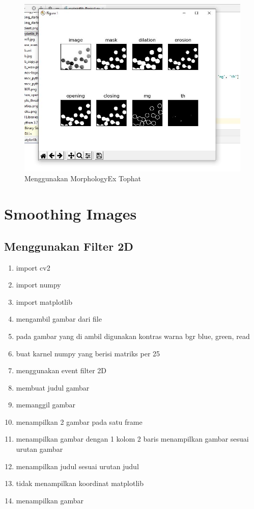 \begin{figure}[ht]
\centering
\includegraphics[scale=0.5]{figures/2,58.jpg}
\caption{Menggunakan MorphologyEx Tophat}
\label{contoh}
\end{figure}







\newpage
\section{Smoothing Images}
\subsection{Menggunakan Filter 2D}

\begin{enumerate}
	\item import cv2
	\item import numpy
	\item import matplotlib
	\item mengambil gambar dari file
	\item pada gambar yang di ambil digunakan kontras warna bgr blue, green, read
	\item buat karnel numpy yang berisi matriks per 25
	\item menggunakan event filter 2D
	\item membuat judul gambar
	\item memanggil gambar
	\item menampilkan 2 gambar pada satu frame
	\item menampilkan gambar dengan 1 kolom 2 baris menampilkan gambar sesuai urutan gambar
	\item menampilkan judul sesuai urutan judul
	\item tidak menampilkan koordinat matplotlib
	\item menampilkan gambar
\end{enumerate}

